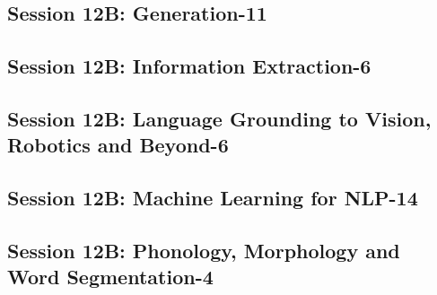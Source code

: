 \subsection{\large Session 12B: Generation-11}
\label{parallel-session-12B-trackB}
\TrackBLoc\hfill\sessionchair{}{}
\clearpage
\subsection{\large Session 12B: Information Extraction-6}
\label{parallel-session-12B-trackC}
\TrackCLoc\hfill\sessionchair{}{}
\clearpage
\subsection{\large Session 12B: Language Grounding to Vision, Robotics and Beyond-6}
\label{parallel-session-12B-trackD}
\TrackDLoc\hfill\sessionchair{}{}
\clearpage
\subsection{\large Session 12B: Machine Learning for NLP-14}
\label{parallel-session-12B-trackE}
\TrackELoc\hfill\sessionchair{}{}
\clearpage
\subsection{\large Session 12B: Phonology, Morphology and Word Segmentation-4}
\label{parallel-session-12B-trackF}
\TrackFLoc\hfill\sessionchair{}{}
\clearpage
